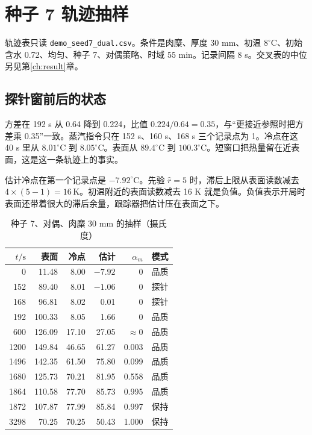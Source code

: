 \chapter{种子 7 轨迹抽样}
\label{app:trace}

轨迹表只读 \texttt{demo\_seed7\_dual.csv}。条件是肉糜、厚度 30 mm、初温 \(8^\circ\mathrm{C}\)、初始含水 0.72、均匀、种子 7、对偶策略、时域 55 min。记录间隔 8 s。交叉表的中位另见第\ref{ch:result}{}章。

\section{探针窗前后的状态}

方差在 192 s 从 0.64 降到 0.224，比值 \(0.224/0.64=0.35\)，与“更接近参照时把方差乘 0.35”一致。蒸汽指令只在 152 s、160 s、168 s 三个记录点为 1。冷点在这 40 s 里从 \(8.01^\circ\mathrm{C}\) 到 \(8.05^\circ\mathrm{C}\)。表面从 \(89.4^\circ\mathrm{C}\) 到 \(100.3^\circ\mathrm{C}\)。短窗口把热量留在近表面，这是这一条轨迹上的事实。

估计冷点在第一个记录点是 \(-7.92^\circ\mathrm{C}\)。先验 \(\hat r=5\) 时，滞后上限从表面读数减去 \(4\times(5-1)=16\,\mathrm{K}\)。初温附近的表面读数减去 16 K 就是负值。负值表示开局时表面还带着很大的滞后余量，跟踪器把估计压在表面之下。

\begin{table}[ht]
\centering
\caption{种子 7、对偶、肉糜 30 mm 的抽样（摄氏度）}
\begin{tabular}{@{}r r r r r l@{}}
\toprule
\(t/\mathrm{s}\) & 表面 & 冷点 & 估计 & \(\alpha_m\) & 模式 \\
\midrule
0 & 11.48 & 8.00 & \(-7.92\) & 0 & 品质 \\
152 & 89.40 & 8.01 & \(-1.06\) & 0 & 探针 \\
168 & 96.81 & 8.02 & 0.01 & 0 & 探针 \\
192 & 100.33 & 8.05 & 1.66 & 0 & 品质 \\
600 & 126.09 & 17.10 & 27.05 & \(\approx 0\) & 品质 \\
1200 & 149.84 & 46.65 & 61.27 & 0.003 & 品质 \\
1496 & 142.35 & 61.50 & 75.80 & 0.099 & 品质 \\
1680 & 125.73 & 70.21 & 81.95 & 0.558 & 品质 \\
1864 & 110.58 & 77.70 & 85.73 & 0.995 & 品质 \\
1872 & 107.87 & 77.99 & 85.84 & 0.997 & 保持 \\
3298 & 70.25 & 70.25 & 50.43 & 1.000 & 保持 \\
\bottomrule
\end{tabular}
\end{table}

